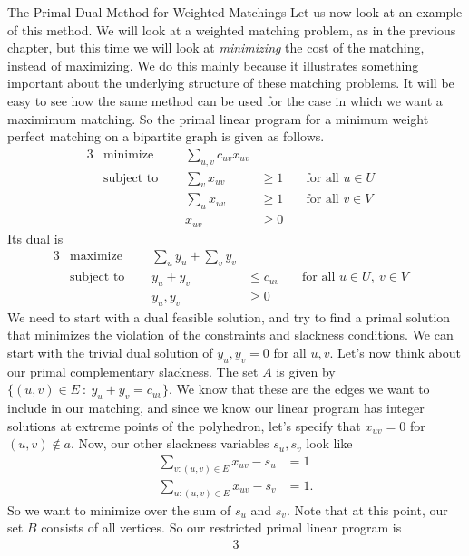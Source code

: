 \begin{section}{The Primal-Dual Method for Weighted Matchings}
	Let us now look at an example of this method. We will look at a weighted matching problem, as 
	in the previous chapter, but this time we will look at \emph{minimizing} the cost of the 
	matching, instead of maximizing. We do this mainly because it illustrates something important 
	about the underlying structure of these matching problems. It will be easy to see how the 
	same method can be used for the case in which we want a maximimum matching. So the primal 
	linear program for a minimum weight perfect matching on a bipartite graph is given as follows. 
	\begin{alignat}{3}
		& \text{minimize } & \sum_{u,v} c_{uv} x_{uv}& \\
		& \text{subject to } \quad & \sum_{v} x_{uv} & \geq 1 & \quad \text{for all } u\in U& \\
				     &\quad & \sum_{u} x_{uv} & \geq 1 & \quad \text{for all } v\in V & \\
				&& x_{uv} & \geq 0
	\end{alignat}
	Its dual is
	\begin{alignat}{3}
		& \text{maximize } & \sum_{u}y_u + \sum_{v}y_v & \\
		& \text{subject to } \quad & y_u + y_v & \leq c_{uv} & \quad \text{for all }
					u\in U,\ v\in V & \\
				    && y_u,y_v & \geq 0
	\end{alignat}
	We need to start with a dual feasible solution, and try to find a primal solution that 
	minimizes the violation of the constraints and slackness conditions. We can start with the 
	trivial dual solution of $y_u,y_v = 0$ for all $u,v$. Let's now think about our primal 
	complementary slackness. The set $A$ is given by $\{(u,v)\in E\ :\ y_u + y_v = c_{uv}\}$. 
	We know that these are the edges we want to include in our matching, and since we know our 
	linear program has integer solutions at extreme points of the polyhedron, let's specify that 
	$x_{uv} = 0$ for $(u,v)\notin a$. Now, our other slackness variables $s_u,s_v$ look like 
	\begin{align*}
		\sum_{v:(u,v)\in E} x_{uv} - s_u &= 1 \\
		\sum_{u:(u,v)\in E} x_{uv} - s_v &= 1.
	\end{align*}
	So we want to minimize over the sum of $s_u$ and $s_v$. Note that at this point, our set $B$ 
	consists of all vertices. So our restricted primal linear program is
	\begin{alignat}{3}

\end{alignat}
\end{section}
